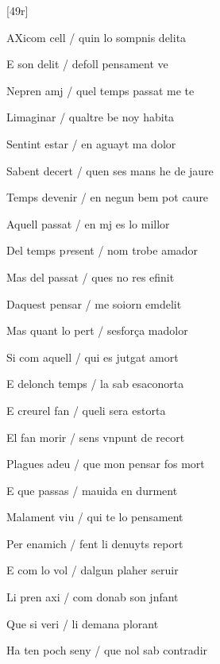 

[49r]
\begin{estrofa}

 AXicom cell / quin lo sompnis delita

 E son delit / defoll pensament ve

 Nepren amj / quel temps passat me te

 Limaginar / qualtre be noy habita

 Sentint estar / en aguayt ma dolor

 Sabent decert / quen ses mans he de jaure

 Temps devenir / en negun bem pot caure

 Aquell passat / en mj es lo millor

\end{estrofa}



\begin{estrofa}

 Del temps p\textit{re}sent / nom trobe amador

 Mas del passat / ques no res efinit

 Daquest pensar / me soiorn emdelit

 Mas quant lo pert / sesfor\c{c}a madolor

 Si com aquell / qui es jutgat amort

 E delonch temps / la sab esaconorta

 E creurel fan / queli sera estorta

 El fan morir / sens vnpunt de recort

\end{estrofa}



\begin{estrofa}

 Plagues adeu / que mon pensar fos mort

 E que passas / mauida en durment

 Malament viu / qui te lo pensament

 Per enamich / fent li denuyts report

 E com lo vol / dalgun plaher seruir

 Li pren axi / com donab son jnfant

 Que si veri / li demana plorant

 Ha ten poch seny / que nol sab contradir

\end{estrofa}



